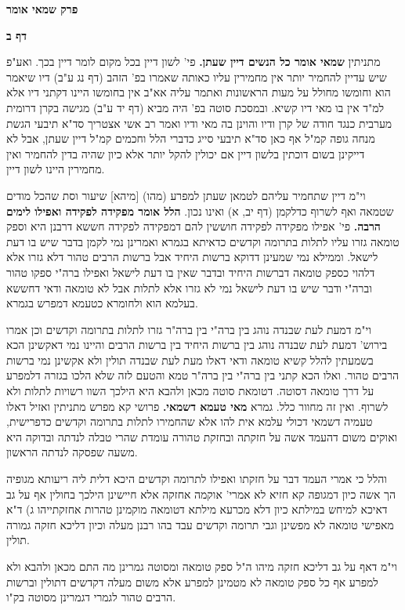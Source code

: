 \documentclass[12pt, openany]{book}
\newcommand{\sethebfont}{
\fontsize{10.5pt}{21.0pt} \selectfont
}
\newcommand{\twocol}[1]{
	{\sethebfont \begin{multicols}{2}
			#1
	\end{multicols}}	
}
\newcommand{\chapname}{}
\newcommand{\sectname}{}
\newcommand{\newchap}[1]{
	\addcontentsline{toc}{chapter}{#1}
	\renewcommand{\chapname}{#1}
		\begin{center}
			\textbf{%
\fontsize{16pt}{16pt}\selectfont
				#1}
		\end{center}
}
\newcommand{\newsection}[1]{
	\addcontentsline{toc}{section}{#1}
	\renewcommand{\sectname}{#1}	
	\vspace{-\baselineskip}
	\begin{center}
		\textbf{%
\fontsize{16pt}{16pt}\selectfont
			#1}
	\end{center}
	\vspace{-\baselineskip}
	\nopagebreak
}
\begin{document}
\newchap{פרק \quad שמאי אומר}
\newsection{דף ב}
\twocol{
מתניתין \textbf{שמאי אומר כל הנשים דיין שעתן.}  פי' לשון דיין בכל מקום לומר דיין בכך. ואע"פ שיש עדיין להחמיר יותר אין מחמירין עליו כאותה שאמרו בפ' הזהב (דף נג ע"ב) דיו שיאמר הוא וחומשו מחולל על מעות הראשונות ואתמר עליה אא"ב אין בחומשו היינו דקתני דיו אלא למ"ד אין בו מאי דיו קשיא. ובמסכת סוטה בפ' היה מביא (דף יד ע"ב) מגישה בקרן דרומית מערבית כנגד חודה של קרן ודיו והוינן בה מאי ודיו ואמר רב אשי אצטריך סד"א תיבעי הגשת מנחה גופה קמ"ל אף כאן סד"א תיבעי סייג כדברי הלל וחכמים קמ"ל דיין שעתן, אבל לא דייקינן בשום דוכתין בלשון דיין אם יכולין להקל יותר אלא כיון שהיה בדין להחמיר ואין מחמירין היינו לשון דיין.\par וי"מ דיין שתחמיר עליהם לטמאן שעתן למפרע (מהו) [מיהא] שיעור וסת שהכל מודים שטמאה ואף לשרוף כדלקמן (דף יב, א) ואינו נכון. 
\textbf{הלל אומר מפקידה לפקידה ואפילו לימים הרבה.}  פי' אפילו מפקידה לפקידה חוששין להם דמפקידה לפקידה חששא דרבנן היא וספק טומאה גזרו עליו לתלות בתרומה וקדשים כדאיתא בגמרא ואמרינן נמי לקמן בדבר שיש בו דעת לישאל. וממילא נמי שמעינן דדוקא ברשות היחיד אבל ברשות הרבים טהור דלא גזרו אלא דלהוי כספק טומאה דברשות היחיד ובדבר שאין בו דעת לישאל ואפילו ברה"י ספקו טהור וברה"י ודבר שיש בו דעת לישאל נמי לא גזרו אלא לתלות אבל לא טומאה ודאי דחששא בעלמא הוא ולחומרא כטעמא דמפרש בגמרא.\par וי"מ דמעת לעת שבנדה נוהג בין ברה"י בין ברה"ר גזרו לתלות בתרומה וקדשים וכן אמרו בירוש' דמעת לעת שבנדה נוהג בין ברשות היחיד בין ברשות הרבים והיינו נמי דאקשינן הכא בשמעתין להלל קשיא טומאה ודאי דאלו מעת לעת שבנדה תולין ולא אקשינן נמי ברשות הרבים טהור. ואלו הכא קתני בין ברה"י בין ברה"ר טמא והטעם לזה שלא הלכו בגזרה דלמפרע על דרך טומאה דסוטה. דטומאת סוטה מכאן ולהבא היא הילכך השוו רשויות לתלות ולא לשרוף. ואין זה מחוור כלל. 
גמרא \textbf{מאי טעמא דשמאי.}  פרושי קא מפרש מתניתין ואזיל דאלו טעמיה דשמאי דכולי עלמא אית להו אלא שהחמירו לתלות בתרומה וקדשים כדפרישית, ואוקים משום דהעמד אשה על חזקתה ובחזקת טהורה עומדת שהרי טבלה לנדתה ובדוקה היא משעה שפסקה לנדתה הראשון.\par  והלל כי אמרי העמד דבר על חזקתו ואפילו לתרומה וקדשים היכא דלית ליה ריעותא מגופיה הך אשה כיון דמגופה קא חזיא לא אמרי' אוקמה אחזקה אלא חיישינן הילכך בחולין אף על גב דאיכא למיחש במילתא כיון דלא מכרעא מילתא דטומאה מוקמינן טהרות אחזקתייהו ג) ד"א מאפישי טומאה לא מפשינן וגבי תרומה וקדשים עבד בהו רבנן מעלה וכיון דליכא חזקה גמורה תולין.\par וי"מ דאף על גב דליכא חזקה מיהו ה"ל ספק טומאה ומסוטה גמרינן מה התם מכאן ולהבא ולא למפרע אף כל ספק טומאה לא מטמינן למפרע אלא משום מעלה דקדשים דתולין וברשות הרבים טהור לגמרי דגמרינן מסוטה בק"ו. 
}
\end{document}
